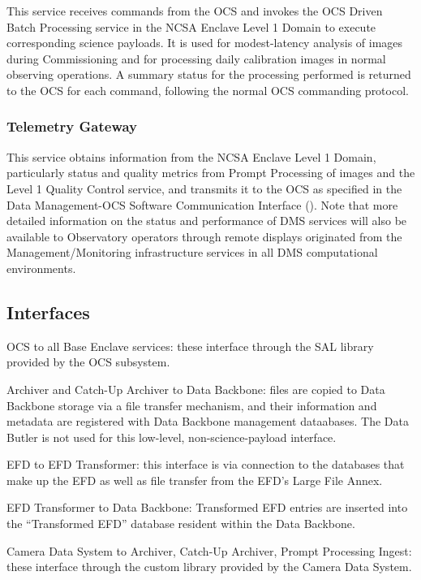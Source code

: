 \documentclass[DM,toc]{lsstdoc}
\begin{document}
This service receives commands from the OCS and invokes the OCS Driven
Batch Processing service in the NCSA Enclave Level 1 Domain to execute
corresponding science payloads. It is used for modest-latency analysis
of images during Commissioning and for processing daily calibration
images in normal observing operations. A summary status for the
processing performed is returned to the OCS for each command, following
the normal OCS commanding protocol.

\subsubsection{Telemetry Gateway}\label{telemetry-gateway}

This service obtains information from the NCSA Enclave Level 1 Domain,
particularly status and quality metrics from Prompt Processing of images
and the Level 1 Quality Control service, and transmits it to the OCS as
specified in the Data Management-OCS Software Communication Interface
(). Note that more detailed information on the status and
performance of DMS services will also be available to Observatory
operators through remote displays originated from the
Management/Monitoring infrastructure services in all DMS computational
environments.

\subsection{Interfaces}\label{base-interfaces}

OCS to all Base Enclave services: these interface through the SAL
library provided by the OCS subsystem.

Archiver and Catch-Up Archiver to Data Backbone: files are copied to
Data Backbone storage via a file transfer mechanism, and their
information and metadata are registered with Data Backbone management
dataabases. The Data Butler is not used for this low-level,
non-science-payload interface.

EFD to EFD Transformer: this interface is via connection to the
databases that make up the EFD as well as file transfer from the EFD's
Large File Annex.

EFD Transformer to Data Backbone: Transformed EFD entries are inserted
into the ``Transformed EFD'' database resident within the Data Backbone.

Camera Data System to Archiver, Catch-Up Archiver, Prompt Processing
Ingest: these interface through the custom library provided by the
Camera Data System.
\end{document}
